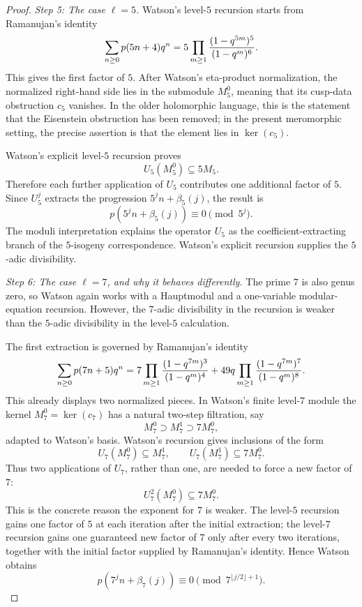 \documentclass[12pt]{amsart}
\theoremstyle{definition}
\theoremstyle{remark}
\begin{document}
\begin{proof}
\smallskip
\noindent
\emph{Step 5: The case \(\ell=5\).}
Watson's level-\(5\) recursion starts from Ramanujan's identity
\[
        \sum_{n\geq0}p(5n+4)q^n
        =
        5\prod_{m\geq1}{(1-q^{5m})^5\over(1-q^m)^6}.
\]
This gives the first factor of \(5\).  After Watson's eta-product
normalization, the normalized right-hand side lies in the submodule
\(M_5^0\), meaning that its cusp-data obstruction \(c_5\) vanishes.  In
the older holomorphic language, this is the statement that the
Eisenstein obstruction has been removed; in the present meromorphic
setting, the precise assertion is that the element lies in
\(\ker(c_5)\).

Watson's explicit level-\(5\) recursion proves
\[
        U_5(M_5^0)\subseteq 5M_5.
\]
Therefore each further application of \(U_5\) contributes one additional
factor of \(5\).  Since \(U_5^j\) extracts the progression
\(5^j n+\beta_5(j)\), the result is
\[
        p(5^j n+\beta_5(j))\equiv0\pmod {5^j}.
\]
The moduli interpretation explains the operator \(U_5\) as the
coefficient-extracting branch of the \(5\)-isogeny correspondence.
Watson's explicit recursion supplies the \(5\)-adic divisibility.

\smallskip
\noindent
\emph{Step 6: The case \(\ell=7\), and why it behaves differently.}
The prime \(7\) is also genus zero, so Watson again works with a
Hauptmodul and a one-variable modular-equation recursion.  However, the
\(7\)-adic divisibility in the recursion is weaker than the
\(5\)-adic divisibility in the level-\(5\) calculation.

The first extraction is governed by Ramanujan's identity
\[
        \sum_{n\geq0}p(7n+5)q^n
        =
        7\prod_{m\geq1}{(1-q^{7m})^3\over(1-q^m)^4}
        +
        49q\prod_{m\geq1}{(1-q^{7m})^7\over(1-q^m)^8}.
\]
This already displays two normalized pieces.  In Watson's finite
level-\(7\) module the kernel \(M_7^0=\ker(c_7)\) has a natural
two-step filtration, say
\[
        M_7^0\supset M_7^1\supset 7M_7^0,
\]
adapted to Watson's basis.  Watson's recursion gives inclusions of the
form
\[
        U_7(M_7^0)\subseteq M_7^1,
        \qquad
        U_7(M_7^1)\subseteq 7M_7^0.
\]
Thus two applications of \(U_7\), rather than one, are needed to force a
new factor of \(7\):
\[
        U_7^2(M_7^0)\subseteq 7M_7^0.
\]
This is the concrete reason the exponent for \(7\) is weaker.  The
level-\(5\) recursion gains one factor of \(5\) at each iteration after
the initial extraction; the level-\(7\) recursion gains one guaranteed
new factor of \(7\) only after every two iterations, together with the
initial factor supplied by Ramanujan's identity.  Hence Watson obtains
\[
        p(7^j n+\beta_7(j))
        \equiv0\pmod {7^{\lfloor j/2\rfloor+1}}.
\]


\end{proof}
\end{document}
